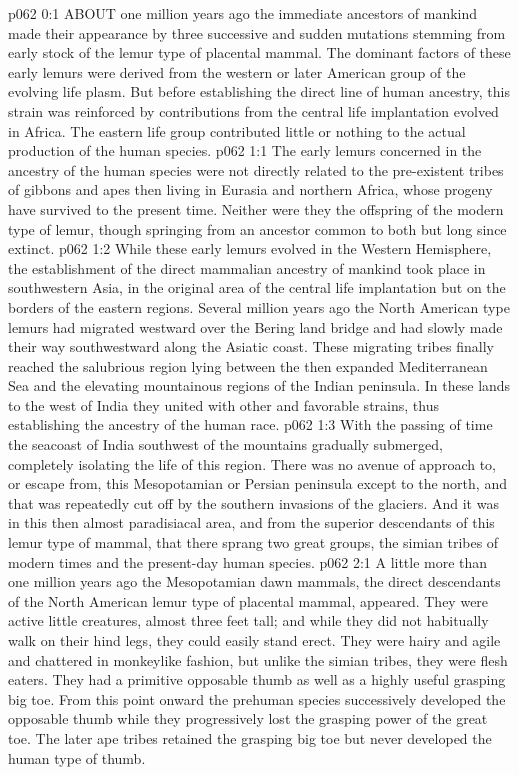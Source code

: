 \vs p062 0:1 ABOUT one million years ago the immediate ancestors of mankind made their appearance by three successive and sudden mutations stemming from early stock of the lemur type of placental mammal. The dominant factors of these early lemurs were derived from the western or later American group of the evolving life plasm. But before establishing the direct line of human ancestry, this strain was reinforced by contributions from the central life implantation evolved in Africa. The eastern life group contributed little or nothing to the actual production of the human species.
\vs p062 1:1 The early lemurs concerned in the ancestry of the human species were not directly related to the pre\hyp{}existent tribes of gibbons and apes then living in Eurasia and northern Africa, whose progeny have survived to the present time. Neither were they the offspring of the modern type of lemur, though springing from an ancestor common to both but long since extinct.
\vs p062 1:2 While these early lemurs evolved in the Western Hemisphere, the establishment of the direct mammalian ancestry of mankind took place in southwestern Asia, in the original area of the central life implantation but on the borders of the eastern regions. Several million years ago the North American type lemurs had migrated westward over the Bering land bridge and had slowly made their way southwestward along the Asiatic coast. These migrating tribes finally reached the salubrious region lying between the then expanded Mediterranean Sea and the elevating mountainous regions of the Indian peninsula. In these lands to the west of India they united with other and favorable strains, thus establishing the ancestry of the human race.
\vs p062 1:3 With the passing of time the seacoast of India southwest of the mountains gradually submerged, completely isolating the life of this region. There was no avenue of approach to, or escape from, this Mesopotamian or Persian peninsula except to the north, and that was repeatedly cut off by the southern invasions of the glaciers. And it was in this then almost paradisiacal area, and from the superior descendants of this lemur type of mammal, that there sprang two great groups, the simian tribes of modern times and the present\hyp{}day human species.
\vs p062 2:1 A little more than one million years ago the Mesopotamian dawn mammals, the direct descendants of the North American lemur type of placental mammal,  appeared. They were active little creatures, almost three feet tall; and while they did not habitually walk on their hind legs, they could easily stand erect. They were hairy and agile and chattered in monkeylike fashion, but unlike the simian tribes, they were flesh eaters. They had a primitive opposable thumb as well as a highly useful grasping big toe. From this point onward the prehuman species successively developed the opposable thumb while they progressively lost the grasping power of the great toe. The later ape tribes retained the grasping big toe but never developed the human type of thumb.
